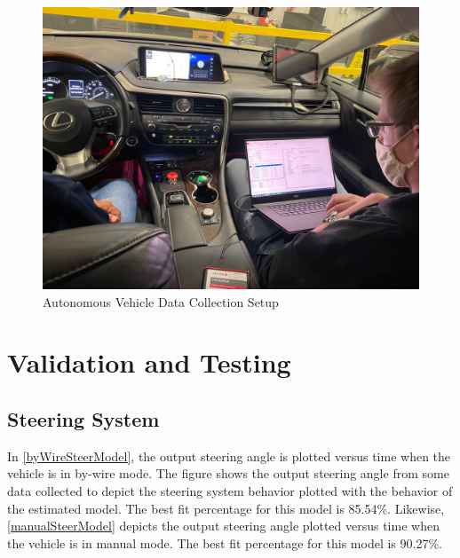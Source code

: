 \documentclass[letterpaper,12pt]{article}   %
\begin{document}
\begin{figure}
	\centering
    	\captionsetup{justification=centering, margin=3cm}
    	\includegraphics[width=5in]{figs/img/picturesVisitToAStuff/dataColletionSetup1-20211007}
    	\caption{Autonomous Vehicle Data Collection Setup}
    	\label{fig:vehicleSetup}
\end{figure}

\section{Validation and Testing} \label{sec:simresults}
\subsection{Steering System}
In \autoref{byWireSteerModel}, the output steering angle is plotted versus time when the vehicle is in by-wire mode. The figure shows the output steering angle from some data collected to depict the steering system behavior plotted with the behavior of the estimated model. The best fit percentage for this model is 85.54\%. Likewise, \autoref{manualSteerModel} depicts the output steering angle plotted versus time when the vehicle is in manual mode. The best fit percentage for this model is 90.27\%. 
\end{document}
